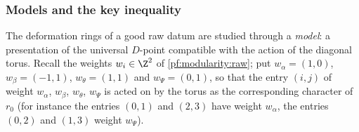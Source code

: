 \subsubsection{Models and the key inequality}\label{sec:pf:modularity:ineq}

The deformation rings of a good raw datum are studied through a \emph{model}: a presentation of the universal
$D$-point compatible with the action of the diagonal torus. Recall the weights $w_i\in\Z^2$ of
\cref{pf:modularity:raw}; put $w_\alpha=(1,0)$, $w_\beta=(-1,1)$, $w_\theta=(1,1)$ and $w_\Psi=(0,1)$, so that the entry
$(i,j)$ of weight $w_\alpha$, $w_\beta$, $w_\theta$, $w_\Psi$ is acted on by the torus as the corresponding character
of $r_0$ (for instance the entries $(0,1)$ and $(2,3)$ have weight $w_\alpha$, the entries $(0,2)$ and $(1,3)$ weight
$w_\Psi$).

